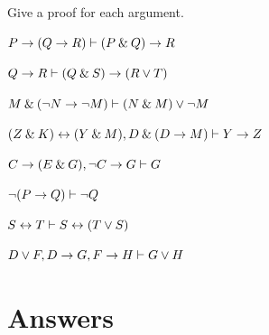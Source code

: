 \problempart
Give a proof for each argument.
\begin{earg}
\item $P \rightarrow (Q \rightarrow R) \vdash (P \mathbin{\&} Q) \rightarrow R$\smallskip
\item $Q \rightarrow R \vdash (Q \mathbin{\&} S) \rightarrow (R \vee T)$\smallskip 
\item $M \mathbin{\&} ({\neg} N \rightarrow {\neg} M) \vdash (N \mathbin{\&} M) \vee {\neg} M$\smallskip
\item $(Z\mathbin{\&} K)\leftrightarrow(Y\mathbin{\&} M), D\mathbin{\&}(D\rightarrow M) \vdash Y\rightarrow Z$\smallskip
\item $C\rightarrow(E\mathbin{\&} G), {\neg} C \rightarrow G \vdash G$\smallskip
\item ${\neg}(P \rightarrow Q) \vdash {\neg} Q$\smallskip
\item $S \leftrightarrow T \vdash S \leftrightarrow (T \vee S)$\smallskip 
\item $D \vee F, D \rightarrow G, F \rightarrow H \vdash G \vee H$\smallskip
\end{earg}





\newpage

\section{Answers}
\setcounter{ProbPart}{0}

